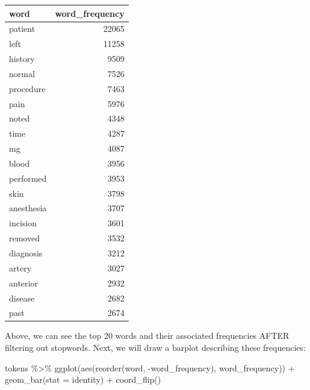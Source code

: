 \documentclass[
]{article}
\newenvironment{Shaded}{\begin{snugshade}}{\end{snugshade}}
\newcommand{\AttributeTok}[1]{\textcolor[rgb]{0.77,0.63,0.00}{#1}}
\newcommand{\FunctionTok}[1]{\textcolor[rgb]{0.00,0.00,0.00}{#1}}
\newcommand{\NormalTok}[1]{#1}
\newcommand{\SpecialCharTok}[1]{\textcolor[rgb]{0.00,0.00,0.00}{#1}}
\newcommand{\StringTok}[1]{\textcolor[rgb]{0.31,0.60,0.02}{#1}}
\begin{document}
\begin{table}
\centering
\begin{tabular}{l|r}
\hline
word & word\_frequency\\
\hline
patient & 22065\\
\hline
left & 11258\\
\hline
history & 9509\\
\hline
normal & 7526\\
\hline
procedure & 7463\\
\hline
pain & 5976\\
\hline
noted & 4348\\
\hline
time & 4287\\
\hline
mg & 4087\\
\hline
blood & 3956\\
\hline
performed & 3953\\
\hline
skin & 3798\\
\hline
anesthesia & 3707\\
\hline
incision & 3601\\
\hline
removed & 3532\\
\hline
diagnosis & 3212\\
\hline
artery & 3027\\
\hline
anterior & 2932\\
\hline
disease & 2682\\
\hline
past & 2674\\
\hline
\end{tabular}
\end{table}

Above, we can see the top 20 words and their associated frequencies
AFTER filtering out stopwords. Next, we will draw a barplot describing
these frequencies:

\begin{Shaded}
\begin{Highlighting}[]
\NormalTok{tokens }\SpecialCharTok{\%\textgreater{}\%}
  \FunctionTok{ggplot}\NormalTok{(}\FunctionTok{aes}\NormalTok{(}\FunctionTok{reorder}\NormalTok{(word, }\SpecialCharTok{{-}}\NormalTok{word\_frequency), word\_frequency)) }\SpecialCharTok{+}
  \FunctionTok{geom\_bar}\NormalTok{(}\AttributeTok{stat =} \StringTok{\textquotesingle{}identity\textquotesingle{}}\NormalTok{) }\SpecialCharTok{+}
  \FunctionTok{coord\_flip}\NormalTok{()}
\end{Highlighting}
\end{Shaded}
\end{document}
